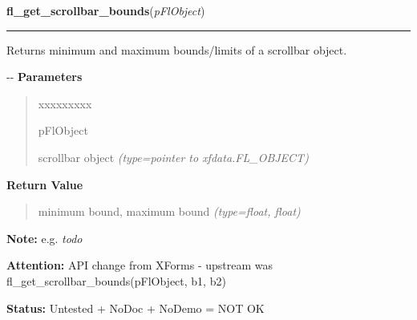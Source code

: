     \vspace{0.5ex}

\hspace{.8\funcindent}\begin{boxedminipage}{\funcwidth}

    \raggedright \textbf{fl\_get\_scrollbar\_bounds}(\textit{pFlObject})

    \vspace{-1.5ex}

    \rule{\textwidth}{0.5\fboxrule}
\setlength{\parskip}{2ex}

Returns minimum and maximum bounds/limits of a scrollbar object.

-{}-
\setlength{\parskip}{1ex}
      \textbf{Parameters}
      \vspace{-1ex}

      \begin{quote}
        \begin{Ventry}{xxxxxxxxx}

          \item[pFlObject]


scrollbar object
            {\it (type=pointer to xfdata.FL\_OBJECT)}

        \end{Ventry}

      \end{quote}

      \textbf{Return Value}
    \vspace{-1ex}

      \begin{quote}

minimum bound, maximum bound
      {\it (type=float, float)}

      \end{quote}

\textbf{Note:} 
e.g. \emph{todo}


\textbf{Attention:} 
API change from XForms - upstream was
fl\_get\_scrollbar\_bounds(pFlObject, b1, b2)


\textbf{Status:} 
Untested + NoDoc + NoDemo = NOT OK


    \end{boxedminipage}

    \label{xformslib:flscrollbar:fl_set_scrollbar_step}

    \vspace{0.5ex}

